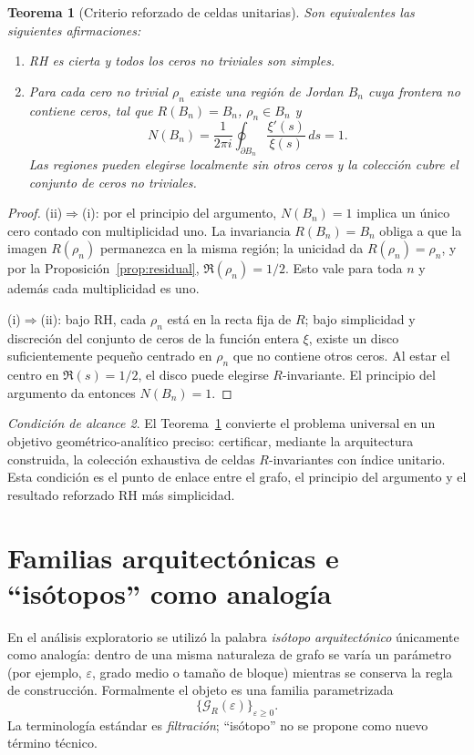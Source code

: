 \documentclass[11pt]{amsart}
\newtheorem{theorem}{Teorema}[section]
\theoremstyle{definition}
\theoremstyle{remark}
\newtheorem{scope}[theorem]{Condición de alcance}
\begin{document}
\begin{theorem}[Criterio reforzado de celdas unitarias]\label{thm:unitcells}
Son equivalentes las siguientes afirmaciones:
\begin{enumerate}[label=(\roman*)]
\item RH es cierta y todos los ceros no triviales son simples.
\item Para cada cero no trivial $\rho_n$ existe una región de Jordan $B_n$ cuya frontera no contiene ceros, tal que $R(B_n)=B_n$, $\rho_n\in B_n$ y
\[
N(B_n)=\frac{1}{2\pi i}\oint_{\partial B_n}\frac{\xi'(s)}{\xi(s)}\,ds=1.
\]
Las regiones pueden elegirse localmente sin otros ceros y la colección cubre el conjunto de ceros no triviales.
\end{enumerate}
\end{theorem}

\begin{proof}
(ii)$\Rightarrow$(i): por el principio del argumento, $N(B_n)=1$ implica un único cero contado con multiplicidad uno. La invariancia $R(B_n)=B_n$ obliga a que la imagen $R(\rho_n)$ permanezca en la misma región; la unicidad da $R(\rho_n)=\rho_n$, y por la Proposición~\ref{prop:residual}, $\Re(\rho_n)=1/2$. Esto vale para toda $n$ y además cada multiplicidad es uno.

(i)$\Rightarrow$(ii): bajo RH, cada $\rho_n$ está en la recta fija de $R$; bajo simplicidad y discreción del conjunto de ceros de la función entera $\xi$, existe un disco suficientemente pequeño centrado en $\rho_n$ que no contiene otros ceros. Al estar el centro en $\Re(s)=1/2$, el disco puede elegirse $R$-invariante. El principio del argumento da entonces $N(B_n)=1$.
\end{proof}

\begin{scope}
El Teorema~\ref{thm:unitcells} convierte el problema universal en un objetivo geométrico-analítico preciso: certificar, mediante la arquitectura construida, la colección exhaustiva de celdas $R$-invariantes con índice unitario. Esta condición es el punto de enlace entre el grafo, el principio del argumento y el resultado reforzado RH más simplicidad.
\end{scope}

\section{Familias arquitectónicas e ``isótopos'' como analogía}
En el análisis exploratorio se utilizó la palabra \emph{isótopo arquitectónico} únicamente como analogía: dentro de una misma naturaleza de grafo se varía un parámetro (por ejemplo, $\varepsilon$, grado medio o tamaño de bloque) mientras se conserva la regla de construcción. Formalmente el objeto es una familia parametrizada
\begin{equation}
 \{\mathcal G_R(\varepsilon)\}_{\varepsilon\ge0}.
\end{equation}
La terminología estándar es \emph{filtración}; ``isótopo'' no se propone como nuevo término técnico.
\end{document}
